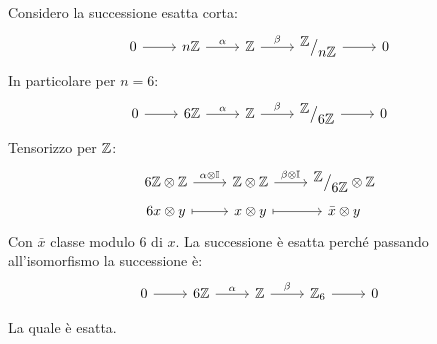 \begin{example}
  Considero la successione esatta corta:
  \[
    \begin{tikzcd}
      0 \rar{} & n \Z \rar{\alpha} & \Z \rar{\beta} & \quot{\Z}{n \Z} \rar & 0
    \end{tikzcd}
  \]
  In particolare per $ n = 6 $:
  \[
    \begin{tikzcd}
      0 \rar{} & 6 \Z \rar{\alpha} & \Z \rar{\beta} & \quot{\Z}{6 \Z} \rar & 0
    \end{tikzcd}
  \]
  Tensorizzo per $ \mathbb{Z} $:
  \[
    \begin{tikzcd}[nodes = {row sep = 3pt}]
      6 \Z \otimes \Z \rar{\alpha \otimes \Id{}} & \Z \otimes \Z \rar{\beta \otimes \Id{}} & \quot{\Z}{6 \Z} \otimes \Z  \\
      6x \otimes y \rar[mapsto] & x \otimes y \rar[mapsto] & \bar{x} \otimes y
    \end{tikzcd}
  \]
  Con $ \bar{x} $ classe modulo 6 di $ x $. La successione è
  esatta perché passando all'isomorfismo la successione è:
  \[
    \begin{tikzcd}[nodes = {row sep = 3pt}]
      0 \rar{} & 6 \Z \rar{\alpha} & \Z \rar{\beta} & \Z_6 \rar & 0 \\
    \end{tikzcd}
  \]
  La quale è esatta.
\end{example}
